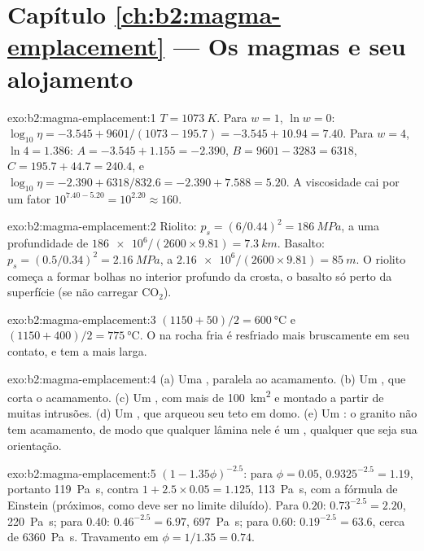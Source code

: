 \section*{Capítulo \ref{ch:b2:magma-emplacement} --- Os magmas e seu alojamento}

\begin{solution}{exo:b2:magma-emplacement:1}
$T = \qty{1073}{K}$. Para $w = 1$, $\ln w = 0$: $\log_{10}\eta = -3.545 +
9601/(1073 - 195.7) = -3.545 + 10.94 = 7.40$. Para $w = 4$, $\ln 4 = 1.386$:
$A = -3.545 + 1.155 = -2.390$, $B = 9601 - 3283 = 6318$, $C = 195.7 + 44.7 =
240.4$, e $\log_{10}\eta = -2.390 + 6318/832.6 = -2.390 + 7.588 = 5.20$. A
viscosidade cai por um fator $10^{7.40 - 5.20} = 10^{2.20} \approx 160$.
\end{solution}

\begin{solution}{exo:b2:magma-emplacement:2}
Riolito: $p_s = (6/0.44)^2 = \qty{186}{MPa}$, a uma profundidade de $\num{186e6}/(2600\times9.81)
= \qty{7.3}{km}$. Basalto: $p_s = (0.5/0.34)^2 = \qty{2.16}{MPa}$, a
$\num{2.16e6}/(2600\times9.81) = \qty{85}{m}$. O riolito começa a formar bolhas
no interior profundo da crosta, o basalto só perto da superfície (se não carregar CO$_2$).
\end{solution}

\begin{solution}{exo:b2:magma-emplacement:3}
$(1150 + 50)/2 = \qty{600}{\celsius}$ e $(1150 + 400)/2 = \qty{775}{\celsius}$. O
 na rocha fria é resfriado mais bruscamente em seu contato, e tem a 
mais larga.
\end{solution}

\begin{solution}{exo:b2:magma-emplacement:4}
(a) Uma , paralela ao acamamento. (b) Um , que corta o acamamento.
(c) Um , com mais de \qty{100}{km^2} e montado a partir de muitas intrusões.
(d) Um , que arqueou seu teto em domo. (e) Um : o granito não tem acamamento,
de modo que qualquer lâmina nele é um , qualquer que seja sua orientação.
\end{solution}

\begin{solution}{exo:b2:magma-emplacement:5}
$(1 - 1.35\phi)^{-2.5}$: para $\phi = 0.05$, $0.9325^{-2.5} = 1.19$, portanto
\qty{119}{Pa.s}, contra $1 + 2.5\times0.05 = 1.125$, \qty{113}{Pa.s}, com a fórmula de
Einstein (próximos, como deve ser no limite diluído). Para $0.20$: $0.73^{-2.5} =
2.20$, \qty{220}{Pa.s}; para $0.40$: $0.46^{-2.5} = 6.97$, \qty{697}{Pa.s}; para $0.60$:
$0.19^{-2.5} = 63.6$, cerca de \qty{6360}{Pa.s}. Travamento em $\phi = 1/1.35 = 0.74$.
\end{solution}

